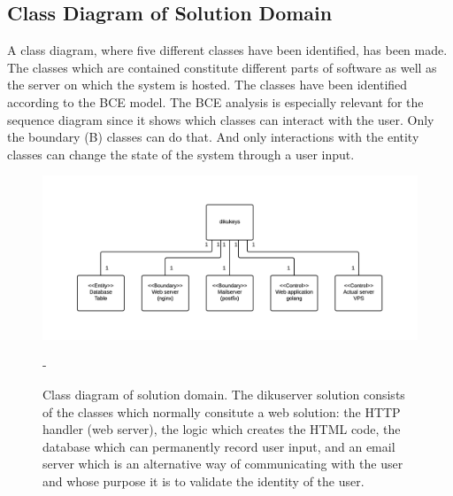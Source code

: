\documentclass[11pt,a4paper]{report}
\begin{document}
\subsection{Class Diagram of Solution Domain}\label{subsec:class_diagram}
A class diagram, where five different classes have been identified, has been made. The classes which are contained constitute different parts of software as well as the server on which the system is hosted. The classes have been identified according to the BCE model. The BCE analysis is especially relevant for the sequence diagram since it shows which classes can interact with the user. Only the boundary (B) classes can do that. And only interactions with the entity classes can change the state of the system through a user input.
\begin{figure}[H]
    \centering
    \includegraphics[width=\textwidth]{pictures/class_diagram}
    \caption{Class diagram of solution domain. The dikuserver solution consists of the classes which normally consitute a web solution: the HTTP handler (web server), the logic which creates the HTML code, the database which can permanently record user input, and an email server which is an alternative way of communicating with the user and whose purpose it is to validate the identity of the user.}     -    \label{fig:class_diagram}
\end{figure}
\subsection*{}
\end{document}
